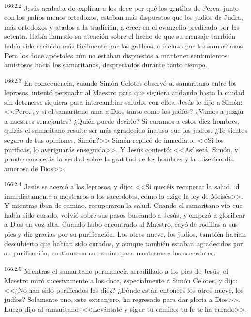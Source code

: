 \par 
\textsuperscript{166:2.2} Jesús acababa de explicar a los doce por qué los gentiles de Perea, junto con los judíos menos ortodoxos, estaban más dispuestos que los judíos de Judea, más ortodoxos y atados a la tradición, a creer en el evangelio predicado por los setenta. Había llamado su atención sobre el hecho de que su mensaje también había sido recibido más fácilmente por los galileos, e incluso por los samaritanos. Pero los doce apóstoles aún no estaban dispuestos a mantener sentimientos amistosos hacia los samaritanos, despreciados durante tanto tiempo.

\par 
\textsuperscript{166:2.3} En consecuencia, cuando Simón Celotes observó al samaritano entre los leprosos, intentó persuadir al Maestro para que siguiera andando hasta la ciudad sin detenerse siquiera para intercambiar saludos con ellos. Jesús le dijo a Simón: <<Pero, ¿y si el samaritano ama a Dios tanto como los judíos? ¿Vamos a juzgar a nuestros semejantes? ¿Quién puede decirlo? Si curamos a estos diez hombres, quizás el samaritano resulte ser más agradecido incluso que los judíos. ¿Te sientes seguro de tus opiniones, Simón?>> Simón replicó de inmediato: <<Si los purificas, lo averiguarás enseguida>>. Y Jesús contestó: <<Así será, Simón, y pronto conocerás la verdad sobre la gratitud de los hombres y la misericordia amorosa de Dios>>.

\par 
\textsuperscript{166:2.4} Jesús se acercó a los leprosos, y dijo: <<Si queréis recuperar la salud, id inmediatamente a mostraros a los sacerdotes, como lo exige la ley de Moisés>>. Y mientras iban de camino, recuperaron la salud. Cuando el samaritano vio que había sido curado, volvió sobre sus pasos buscando a Jesús, y empezó a glorificar a Dios en voz alta. Cuando hubo encontrado al Maestro, cayó de rodillas a sus pies y dio gracias por su purificación. Los otros nueve, los judíos, también habían descubierto que habían sido curados, y aunque también estaban agradecidos por su purificación, continuaron su camino para mostrarse a los sacerdotes.

\par 
\textsuperscript{166:2.5} Mientras el samaritano permanecía arrodillado a los pies de Jesús, el Maestro miró sucesivamente a los doce, especialmente a Simón Celotes, y dijo: <<¿No han sido purificados los diez? ¿Dónde están entonces los otros nueve, los judíos? Solamente uno, este extranjero, ha regresado para dar gloria a Dios>>. Luego dijo al samaritano: <<Levántate y sigue tu camino; tu fe te ha curado>>.


